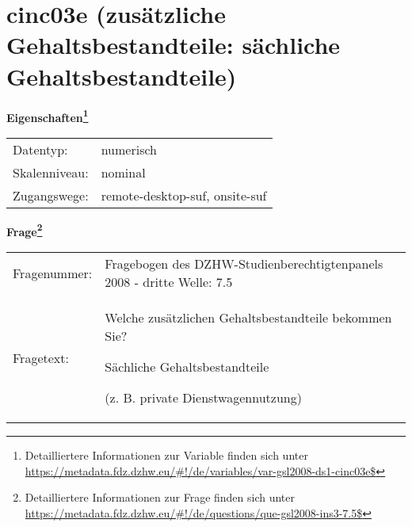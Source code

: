 
    \setcounter{footnote}{0}

    \vspace*{-1.8cm}
	\section{cinc03e (zusätzliche Gehaltsbestandteile: sächliche Gehaltsbestandteile)}
	\label{section:cinc03e}



    \vspace*{0.5cm}
    \noindent\textbf{Eigenschaften\footnote{Detailliertere Informationen zur Variable finden sich unter
		\url{https://metadata.fdz.dzhw.eu/\#!/de/variables/var-gsl2008-ds1-cinc03e$}}}\\
	\begin{tabularx}{\hsize}{@{}lX}
	Datentyp: & numerisch \\
	Skalenniveau: & nominal \\
	Zugangswege: &
	  remote-desktop-suf, 
	  onsite-suf
 \\
    \end{tabularx}



				\vspace*{0.5cm}
                \noindent\textbf{Frage\footnote{Detailliertere Informationen zur Frage finden sich unter
		              \url{https://metadata.fdz.dzhw.eu/\#!/de/questions/que-gsl2008-ins3-7.5$}}}\\
				\begin{tabularx}{\hsize}{@{}lX}
					Fragenummer: &
					  Fragebogen des DZHW-Studienberechtigtenpanels 2008 - dritte Welle:
					  7.5
 \\
					Fragetext: & Welche zusätzlichen Gehaltsbestandteile bekommen Sie?\par  Sächliche Gehaltsbestandteile\par  (z. B. private Dienstwagennutzung) \\
				\end{tabularx}





